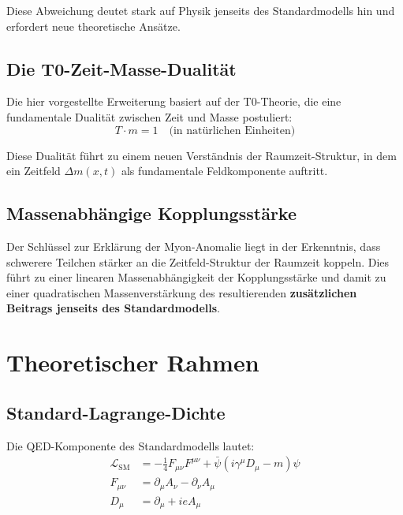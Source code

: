 \documentclass[12pt,a4paper]{article}
\theoremstyle{definition}
\begin{document}
	Diese Abweichung deutet stark auf Physik jenseits des Standardmodells hin und erfordert neue theoretische Ansätze.
	
	\subsection{Die T0-Zeit-Masse-Dualität}
	
	Die hier vorgestellte Erweiterung basiert auf der T0-Theorie\cite{pascher_t0_theory_2025}, die eine fundamentale Dualität zwischen Zeit und Masse postuliert:
	\begin{equation}
		T \cdot m = 1 \quad \text{(in natürlichen Einheiten)}
	\end{equation}
	
	Diese Dualität führt zu einem neuen Verständnis der Raumzeit-Struktur, in dem ein Zeitfeld $\Delta m(x,t)$ als fundamentale Feldkomponente auftritt\cite{pascher_lagrangian_extended_2025}.
	
	\subsection{Massenabhängige Kopplungsstärke}
	
	Der Schlüssel zur Erklärung der Myon-Anomalie liegt in der Erkenntnis, dass schwerere Teilchen stärker an die Zeitfeld-Struktur der Raumzeit koppeln. Dies führt zu einer linearen Massenabhängigkeit der Kopplungsstärke und damit zu einer quadratischen Massenverstärkung des resultierenden \textbf{zusätzlichen Beitrags jenseits des Standardmodells}.
	
	\section{Theoretischer Rahmen}
	
	\subsection{Standard-Lagrange-Dichte}
	
	Die QED-Komponente des Standardmodells lautet:
	\begin{align}
		\mathcal{L}_{\text{SM}} &= -\tfrac{1}{4} F_{\mu\nu}F^{\mu\nu} + \bar{\psi}(i\gamma^\mu D_\mu - m)\psi \label{eq:sm_lagrangian}\\
		F_{\mu\nu} &= \partial_\mu A_\nu - \partial_\nu A_\mu \label{eq:field_tensor}\\
		D_\mu &= \partial_\mu + ieA_\mu \label{eq:covariant_derivative}
	\end{align}
	
\end{document}
